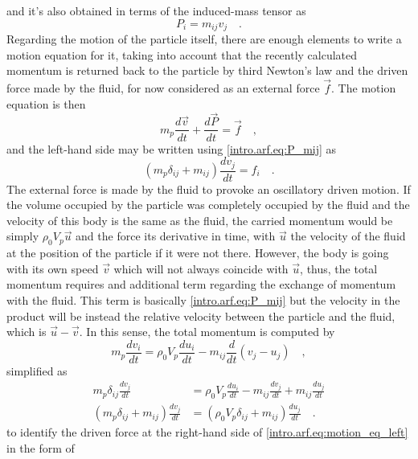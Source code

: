 and it's also obtained in terms of the induced-mass tensor as
\begin{equation}\label{intro.arf.eq:P_mij}
    P_i = m_{ij}v_j\quad.
\end{equation}
Regarding the motion of the particle itself, there are enough elements to write a motion equation for it, taking into account that the recently calculated momentum is returned back to the particle by third Newton's law and the driven force made by the fluid, for now considered as an external force $\vec f$. The motion equation is then
\begin{equation}\label{intro.arf.eq:motion_eq_left}
    m_p\frac{d\vec v}{dt} + \frac{d\vec P}{dt} = \vec f\quad,
\end{equation}
and the left-hand side may be written using \eqref{intro.arf.eq:P_mij} as
\begin{equation}\label{intro.arf.eq:motion_eq_tensor_left}
    (m_p\delta_{ij} + m_{ij})\frac{d v_j}{dt} = f_i\quad.
\end{equation}
The external force is made by the fluid to provoke an oscillatory driven motion. If the volume occupied by the particle was completely occupied by the fluid and the velocity of this body is the same as the fluid, the carried momentum would be simply $\rho_0V_p\vec u$ and the force its derivative in time, with $\vec u$ the velocity of the fluid at the position of the particle if it were not there. However, the body is going with its own speed $\vec v$ which will not always coincide with $\vec u$, thus, the total momentum requires and additional term regarding the exchange of momentum with the fluid. This term is basically \eqref{intro.arf.eq:P_mij} but the velocity in the product will be instead the relative velocity between the particle and the fluid, which is $\vec u - \vec v$. In this sense, the total momentum is computed by
\begin{equation}\label{intro.arf.eq:motion_eq_left}
    m_p\frac{dv_i}{dt} = \rho_0 V_p\frac{du_i}{dt} - m_{ij}\frac{d}{dt}(v_j - u_j)\quad,
\end{equation}
simplified as
\begin{align}
    m_p\delta_{ij}\frac{dv_j}{dt} &= \rho_0 V_p\frac{du_i}{dt} - m_{ij}\frac{dv_j}{dt} + m_{ij}\frac{du_j}{dt}\nonumber\\
    (m_p\delta_{ij} + m_{ij})\frac{dv_j}{dt} &=(\rho_0V_p\delta_{ij} + m_{ij})\frac{du_j}{dt}\quad.\label{intro.arf.eq:complete_eq_motion}
\end{align}
to identify the driven force at the right-hand side of \eqref{intro.arf.eq:motion_eq_left} in the form of

